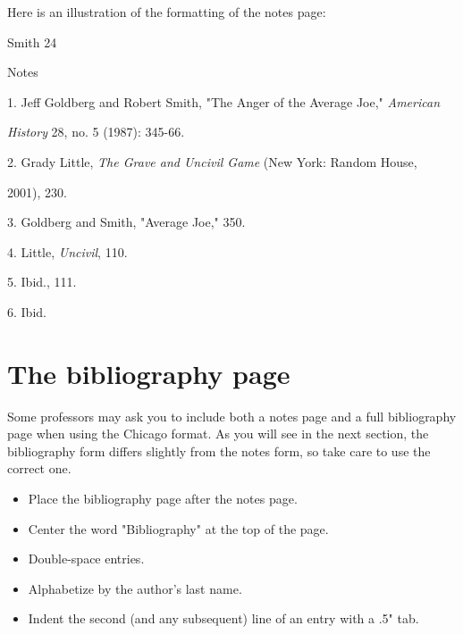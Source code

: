 Here is an illustration of the formatting of the notes page:
\newpage

\thispagestyle{empty}

\thispagestyle{empty}
\begin{flushright}Smith 24\end{flushright}
\begin{center}Notes\end{center}

\hspace{.4in}1. Jeff Goldberg and Robert Smith, "The Anger of the Average Joe," 
\emph{American}

\emph{History} 28, no. 5 (1987): 345-66.

\hspace{.4in} 2. Grady Little, \emph{The Grave and Uncivil Game} (New York: Random House, 

2001), 230.

  \hspace{.4in} 3. Goldberg and Smith, "Average Joe," 350.

  \hspace{.4in} 4. Little, \emph{Uncivil}, 110.

 \hspace{.4in}  5. Ibid., 111.

  \hspace{.4in} 6. Ibid.


\newpage


\section{The bibliography page}
Some professors may ask you to include both a notes page and a full bibliography page 
when using the Chicago format. As you will see in the next section, the bibliography 
form differs slightly from the notes form, so take care to use the correct one.

\begin{itemize}
\item Place the bibliography page after the notes page.
\item Center the word "Bibliography" at the top of the page.
\item Double-space entries.
\item Alphabetize by the author's last name.
\item Indent the second (and any subsequent) line of an entry with a .5" tab.
\end{itemize}

